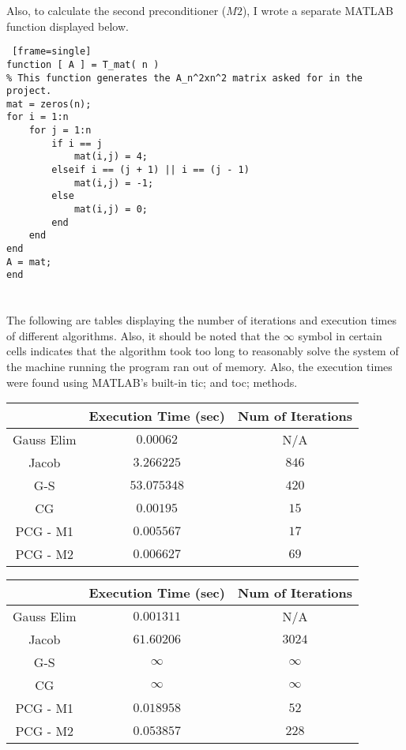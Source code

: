 \documentclass[paper=a4, fontsize=11pt]{scrartcl} %
\numberwithin{equation}{section} %
\numberwithin{figure}{section} %
\numberwithin{table}{section} %
\begin{document}
\bigskip
\bigskip

Also, to calculate the second preconditioner ($M2$), I wrote a separate MATLAB function displayed below.  

\begin{lstlisting} [frame=single]
function [ A ] = T_mat( n )
% This function generates the A_n^2xn^2 matrix asked for in the project.  
mat = zeros(n);
for i = 1:n
    for j = 1:n
        if i == j
            mat(i,j) = 4;
        elseif i == (j + 1) || i == (j - 1)
            mat(i,j) = -1;
        else
            mat(i,j) = 0;
        end
    end
end
A = mat;
end
\end{lstlisting}

\bigskip
\bigskip
\bigskip
\bigskip
\bigskip
\bigskip
\bigskip
\bigskip
\bigskip


\section{}


The following are tables displaying the number of iterations and execution times of different algorithms.  Also, it should be noted that the $\infty$ symbol in certain cells indicates that the algorithm took too long to reasonably solve the system of the machine running the program ran out of memory.  Also, the execution times were found using MATLAB's built-in tic; and toc; methods.  

\begin{center}
\begin{tabular} {| c | c | c |}
\hline
          & Execution Time (sec) & Num of Iterations\\ \hline
Gauss Elim& $0.00062$ & N/A\\ \hline
Jacob     & $3.266225$ & $846$\\ \hline
G-S       & $53.075348$ & $420$\\ \hline
CG        & $0.00195$ & $15$\\ \hline
PCG - M1  & $0.005567$ & $17$\\ \hline
PCG - M2  & $0.006627$ & $69$\\
\hline
\end{tabular}
\end{center}

\begin{center}
\begin{tabular} {| c | c | c |}
\hline
          & Execution Time (sec) & Num of Iterations\\ \hline
Gauss Elim& $0.001311$ & N/A\\ \hline
Jacob     & $61.60206$ & $3024$\\ \hline
G-S       & $ \infty $ & $\infty$\\ \hline
CG        & $ \infty $ & $\infty$\\ \hline
PCG - M1  & $0.018958$ & $52$\\ \hline
PCG - M2  & $0.053857$ & $228$\\
\hline
\end{tabular}
\end{center}
\end{document}
